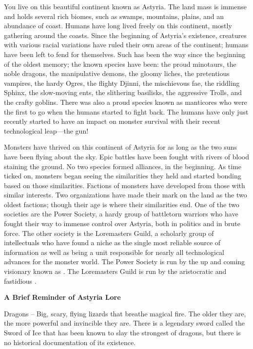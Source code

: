 \documentclass[blue]{guildcamp2}
\begin{document}
\name{\bAstyria{}}

You live on this beautiful continent known as Astyria. The land mass is immense and holds several rich biomes, such as swamps, mountains, plains, and an abundance of coast. Humans have long lived freely on this continent, mostly gathering around the coasts. Since the beginning of Astyria's existence, creatures with various racial variations have ruled their own areas of the continent; humans have been left to fend for themselves. Such has been the way since the beginning of the oldest memory; the known species have been: the proud minotaurs, the noble dragons, the manipulative demons, the gloomy liches, the pretentious vampires, the hardy Ogres, the flighty Djinni, the mischievous fae, the riddling Sphinx, the slow-moving ents, the slithering basilisks, the aggressive Trolls, and the crafty goblins. There was also a proud species known as manticores who were the first to go when the humans started to fight back. The humans have only just recently started to have an impact on monster survival with their recent technological leap---the gun!

Monsters have thrived on this continent of Astyria for as long as the two suns have been flying about the sky. Epic battles have been fought with rivers of blood staining the ground. No two species formed alliances, in the beginning. As time ticked on, monsters began seeing the similarities they held and started bonding based on those similarities. Factions of monsters have developed from those with similar interests. Two organizations have made their mark on the land as the two oldest factions; though their age is where their similarities end. One of the two societies are the Power Society, a hardy group of battletorn warriors who have fought their way to immense control over Astyria, both in politics and in brute force. The other society is the Loremasters Guild, a scholarly group of intellectuals who have found a niche as the single most reliable source of information as well as being a unit responsible for nearly all technological advances for the monster world. The Power Society is run by the up and coming visionary known as \cRed{}. The Loremasters Guild is run by the aristocratic and fastidious \cVampire{}.

{\bf A Brief Reminder of Astyria Lore}

Dragons -- Big, scary, flying lizards that breathe magical fire. The older they are, the more powerful and invincible they are. There is a legendary sword called the Sword of Ice that has been known to slay the strongest of dragons, but there is no historical documentation of its existence.
\end{document}

